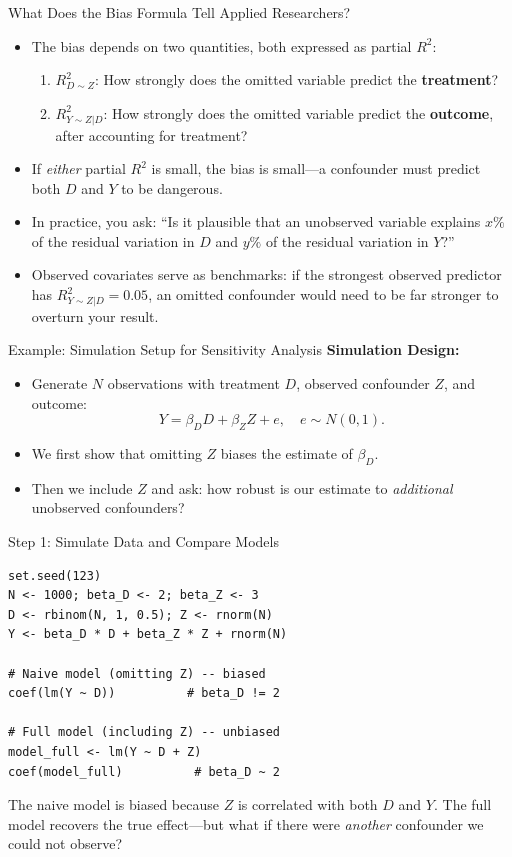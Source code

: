 \documentclass[aspectratio=169, handout, t]{beamer}
\numberwithin{equation}{section}
\begin{document}
\begin{frame}{What Does the Bias Formula Tell Applied Researchers?}
\begin{itemize}
\item The bias depends on two quantities, both expressed as partial $R^2$:
\begin{enumerate}
\item $R^2_{D\sim Z}$: How strongly does the omitted variable predict the \textbf{treatment}?
\item $R^2_{Y\sim Z|D}$: How strongly does the omitted variable predict the \textbf{outcome}, after accounting for treatment?
\end{enumerate}\pause
\item If \emph{either} partial $R^2$ is small, the bias is small---a confounder must predict both $D$ and $Y$ to be dangerous.\pause
\item In practice, you ask: ``Is it plausible that an unobserved variable explains $x\%$ of the residual variation in $D$ and $y\%$ of the residual variation in $Y$?''
\item Observed covariates serve as benchmarks: if the strongest observed predictor has $R^2_{Y\sim Z|D}=0.05$, an omitted confounder would need to be far stronger to overturn your result.
\end{itemize}
\end{frame}

\begin{frame}{Example: Simulation Setup for Sensitivity Analysis}
\textbf{Simulation Design:}
\begin{itemize}
    \item Generate \(N\) observations with treatment \(D\), observed confounder \(Z\), and outcome:
    \[
    Y = \beta_D D + \beta_Z Z + e,\quad e \sim N(0,1).
    \]
    \item We first show that omitting \(Z\) biases the estimate of \(\beta_D\).
    \item Then we include \(Z\) and ask: how robust is our estimate to \emph{additional} unobserved confounders?
\end{itemize}
\end{frame}

\begin{frame}[fragile]{Step 1: Simulate Data and Compare Models}
\begin{lstlisting}
set.seed(123)
N <- 1000; beta_D <- 2; beta_Z <- 3
D <- rbinom(N, 1, 0.5); Z <- rnorm(N)
Y <- beta_D * D + beta_Z * Z + rnorm(N)

# Naive model (omitting Z) -- biased
coef(lm(Y ~ D))          # beta_D != 2

# Full model (including Z) -- unbiased
model_full <- lm(Y ~ D + Z)
coef(model_full)          # beta_D ~ 2
\end{lstlisting}
\vspace{1ex}
The naive model is biased because $Z$ is correlated with both $D$ and $Y$. The full model recovers the true effect---but what if there were \emph{another} confounder we could not observe?
\end{frame}
\end{document}
